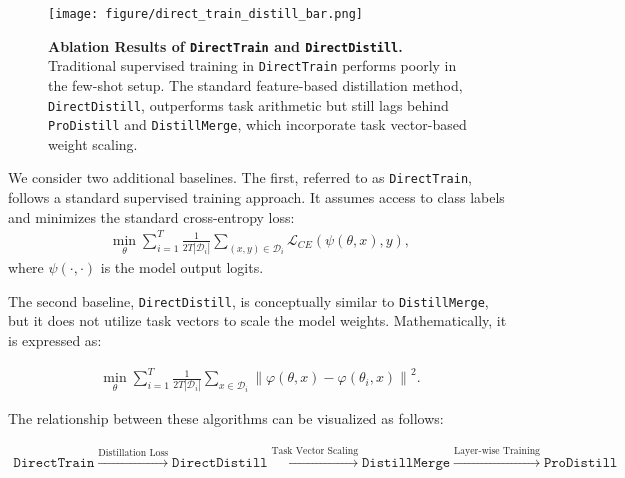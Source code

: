 \begin{figure}[!h]
    \centering
    \texttt{[image: figure/direct\_train\_distill\_bar.png]}
    \caption{\textbf{Ablation Results of \texttt{DirectTrain} and \texttt{DirectDistill}.} Traditional supervised training in \texttt{DirectTrain} performs poorly in the few-shot setup. The standard feature-based distillation method, \texttt{DirectDistill}, outperforms task arithmetic but still lags behind \texttt{ProDistill} and \texttt{DistillMerge}, which incorporate task vector-based weight scaling.}
    \label{fig:direct distill}
\end{figure}
We consider two additional baselines. The first, referred to as \texttt{DirectTrain}, follows a standard supervised training approach. It assumes access to class labels and minimizes the standard cross-entropy loss:
\begin{align*}
    \min_{\theta} \sum_{i=1}^T \frac{1}{2T|\mathcal{D}_i|}\sum_{(x, y)\in\mathcal{D}_i}\mathcal{L}_{CE}\left(\psi(\theta, x), y\right),
\end{align*}
where $\psi(\cdot, \cdot)$ is the model output logits. 

The second baseline, \texttt{DirectDistill}, is conceptually similar to \texttt{DistillMerge}, but it does not utilize task vectors to scale the model weights. Mathematically, it is expressed as:

\begin{align*}\min_{\theta}\sum_{i=1}^{T}\frac{1}{2T|\mathcal{D}_{i}|}\sum_{x\in\mathcal{D}_i}
\nonumber\left\|\varphi\left(\theta, x\right) -\varphi\left(\theta_{i},x\right)\right\|^{2}.\end{align*} 

The relationship between these algorithms can be visualized as follows:

\begin{align*}
    \texttt{DirectTrain}\xrightarrow{\text{Distillation Loss}} \texttt{DirectDistill}\xrightarrow{\text{Task Vector Scaling}} \texttt{DistillMerge} \xrightarrow{\text{Layer-wise Training}} \texttt{ProDistill}
\end{align*}

